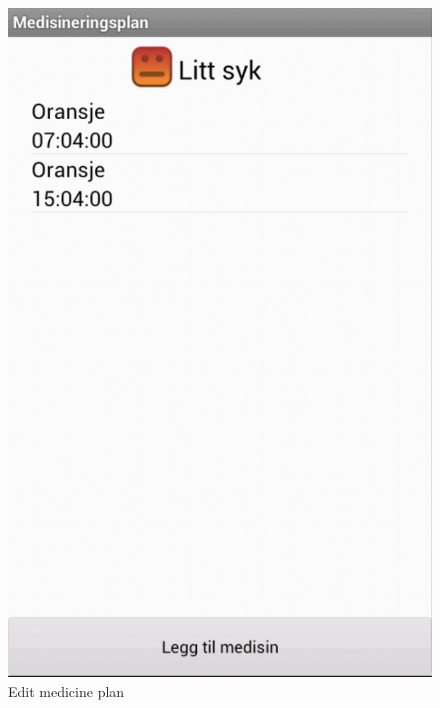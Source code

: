 \begin{figure}
\begin{minipage}[b]{0.4\linewidth}
			\includegraphics[width=0.20\paperwidth]{Pictures/app-screenshots/medicine_plan_close_view.png}
		\caption{Edit medicine plan}
		\label{fig:edit_medicine_plan}
	\end{minipage}
	\hspace{3cm}
		\begin{minipage}[b]{0.4\linewidth}
		\centering

\end{minipage}
\end{figure}
